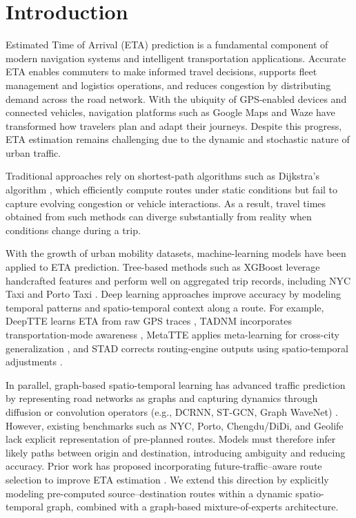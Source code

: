 \section{Introduction}
Estimated Time of Arrival (ETA) prediction is a fundamental component of modern navigation systems and intelligent transportation applications. Accurate ETA enables commuters to make informed travel decisions, supports fleet management and logistics operations, and reduces congestion by distributing demand across the road network. With the ubiquity of GPS-enabled devices and connected vehicles, navigation platforms such as Google Maps and Waze \cite{derrowpinion2021googlemaps,hoseinzadeh2020waze,amin-naseri2018waze} have transformed how travelers plan and adapt their journeys. Despite this progress, ETA estimation remains challenging due to the dynamic and stochastic nature of urban traffic.

Traditional approaches rely on shortest-path algorithms such as Dijkstra's algorithm \cite{dijkstra1959}, which efficiently compute routes under static conditions but fail to capture evolving congestion or vehicle interactions. As a result, travel times obtained from such methods can diverge substantially from reality when conditions change during a trip.

With the growth of urban mobility datasets, machine-learning models have been applied to ETA prediction. Tree-based methods such as XGBoost \cite{chen2016xgboost} leverage handcrafted features and perform well on aggregated trip records, including NYC Taxi and Porto Taxi \cite{nyc_tlc,moreira2013porto}. Deep learning approaches improve accuracy by modeling temporal patterns and spatio-temporal context along a route. For example, DeepTTE learns ETA from raw GPS traces \cite{wang2018deeptte}, TADNM incorporates transportation-mode awareness \cite{xu2020tadnm}, MetaTTE applies meta-learning for cross-city generalization \cite{wang2022metatte}, and STAD corrects routing-engine outputs using spatio-temporal adjustments \cite{abbar2020stad}.

In parallel, graph-based spatio-temporal learning has advanced traffic prediction by representing road networks as graphs and capturing dynamics through diffusion or convolution operators (e.g., DCRNN, ST-GCN, Graph WaveNet) \cite{li2018dcrnn,yu2018stgcn,wu2019graphwavenet}. However, existing benchmarks such as NYC, Porto, Chengdu/DiDi, and Geolife \cite{nyc_tlc,moreira2013porto,didi2016,zheng2012geolife} lack explicit representation of pre-planned routes. Models must therefore infer likely paths between origin and destination, introducing ambiguity and reducing accuracy. Prior work has proposed incorporating future-traffic–aware route selection to improve ETA estimation \cite{voloch2021}. We extend this direction by explicitly modeling pre-computed source–destination routes within a dynamic spatio-temporal graph, combined with a graph-based mixture-of-experts architecture.


